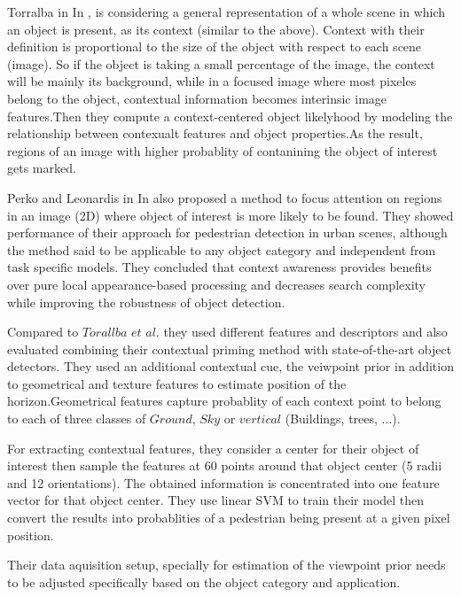      
     Torralba in In \cite{TorralbaContextualPriming}, is considering a general representation of a whole scene in which an object is present, as its context (similar to the above). Context with their definition is proportional to the size of the object with respect to each scene (image). So if the object is taking a small percentage of the image, the context will be mainly its background, while in a focused image where most pixeles belong to the object, contextual information becomes interinsic image features.Then they compute a context-centered object likelyhood by modeling the relationship between contexualt features and object properties.As the result, regions of an image with higher probablity of contanining the object of interest gets marked.   
     
     Perko and Leonardis in In \cite{PerkoLeonardisContextDriven} also proposed a method to focus attention on regions in an image (2D) where object of interest is more likely to be found. They showed performance of their approach for pedestrian detection in urban scenes, although the method said to be applicable to any object category and independent from task specific models. They concluded that context awareness provides benefits over pure local appearance-based processing and decreases search complexity while improving the robustness of object detection. 
     
     Compared to $Torallba$ $et$ $al.$ they used different features and descriptors and also evaluated combining their contextual priming method with state-of-the-art object detectors. They used an additional contextual cue, the veiwpoint prior in addition to geometrical and texture features to estimate position of the horizon.Geometrical features capture probablity of each context point to belong to each of three classes of $Ground$, $Sky$ or $vertical$ (Buildings, trees, ...). 
     
     For extracting contextual features, they consider a center for their object of interest then sample the features at 60 points around that object center (5 radii and 12 orientations). The obtained information is concentrated into one feature vector for that object center. They use linear SVM to train their model then convert the results into probablities of a pedestrian being present at a given pixel position. 
     
     Their data aquisition setup, specially for estimation of the viewpoint prior needs to be adjusted specifically based on the object category and application. 
     

